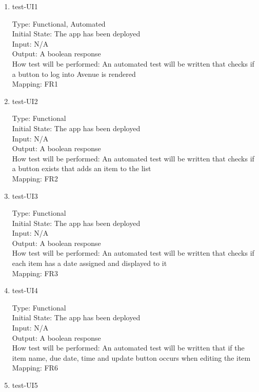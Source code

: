\documentclass[12pt, titlepage]{article}
\begin{document}
\begin{enumerate}
\item{test-UI1\\}

Type: Functional, Automated\\
Initial State: The app has been deployed\\
Input: N/A\\
Output: A boolean response\\
How test will be performed: An automated test will be written that checks if a button to log into Avenue is rendered\\
Mapping: FR1

\item{test-UI2\\}

Type: Functional\\
Initial State: The app has been deployed\\
Input: N/A\\
Output: A boolean response\\
How test will be performed: An automated test will be written that checks if a button exists that adds an item to the list\\
Mapping: FR2

\item{test-UI3\\}

Type: Functional\\
Initial State: The app has been deployed\\
Input: N/A\\
Output: A boolean response\\
How test will be performed: An automated test will be written that checks if each item has a date assigned and displayed to it\\
Mapping: FR3

\item{test-UI4\\}

Type: Functional\\
Initial State: The app has been deployed\\
Input: N/A\\
Output: A boolean response\\
How test will be performed: An automated test will be written that if the item name, due date, time and update button occurs when editing the item\\
Mapping: FR6

\item{test-UI5\\}


\end{enumerate}
\end{document}
